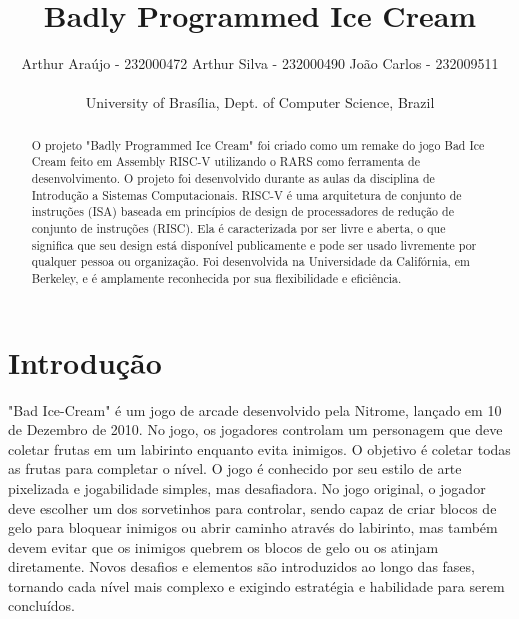 \documentclass[a4paper]{sbgames}
\begin{document}
\title{Badly Programmed Ice Cream}



 \author{ Arthur Araújo - 232000472
         \hspace{28pt} Arthur Silva - 232000490
         \hspace{28pt} João Carlos - 232009511 \\
         \vspace{0pt} \\
         {University of Brasília, Dept. of Computer Science, Brazil} }
        
\vspace{1.5cm}


\maketitle


\begin{abstract}
O projeto "Badly Programmed Ice Cream" foi criado como um remake do jogo Bad Ice Cream feito em Assembly RISC-V utilizando o RARS como ferramenta de desenvolvimento. O projeto foi desenvolvido durante as aulas da disciplina de Introdução a Sistemas Computacionais. RISC-V é uma arquitetura de conjunto de instruções (ISA) baseada em princípios de design de processadores de redução de conjunto de instruções (RISC). Ela é caracterizada por ser livre e aberta, o que significa que seu design está disponível publicamente e pode ser usado livremente por qualquer pessoa ou organização. Foi desenvolvida na Universidade da Califórnia, em Berkeley, e é amplamente reconhecida por sua flexibilidade e eficiência.
\end{abstract}


\section{Introdução}
\label{sec:introducao}


"Bad Ice-Cream" é um jogo de arcade desenvolvido pela Nitrome, lançado em 10 de Dezembro de 2010. No jogo, os jogadores controlam um personagem que deve coletar frutas em um labirinto enquanto evita inimigos. O objetivo é coletar todas as frutas para completar o nível. O jogo é conhecido por seu estilo de arte pixelizada e jogabilidade simples, mas desafiadora.
No jogo original, o jogador deve escolher um dos sorvetinhos para controlar, sendo capaz de criar blocos de gelo para bloquear inimigos ou abrir caminho através do labirinto, mas também devem evitar que os inimigos quebrem os blocos de gelo ou os atinjam diretamente. Novos desafios e elementos são introduzidos ao longo das fases, tornando cada nível mais complexo e exigindo estratégia e habilidade para serem concluídos.
\end{document}
